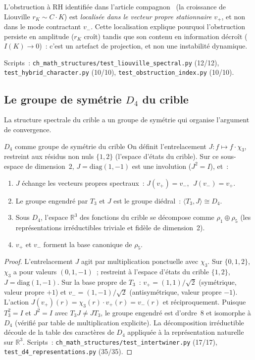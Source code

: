 \documentclass[12pt,a4paper]{article}
\begin{document}
L'obstruction à RH identifiée dans l'article
compagnon~\cite{companion_M1} (la croissance de Liouville
$r_K \sim C \cdot K$) est \emph{localisée dans le vecteur propre
stationnaire $v_+$}, et non dans le mode contractant $v_-$. Cette
localisation explique pourquoi l'obstruction persiste en amplitude
($r_K$ croît) tandis que son contenu en information décroît
($I(K) \to 0$)~: c'est un artefact de projection, et non une
instabilité dynamique.

Scripts~:
\texttt{ch\_math\_structures/test\_liouville\_spectral.py} (12/12),
\texttt{test\_hybrid\_character.py} (10/10),
\texttt{test\_obstruction\_index.py} (10/10).

\subsection{Le groupe de symétrie $D_4$ du crible}
\label{sec:ch7b_d4}

La structure spectrale du crible a un groupe de symétrie qui organise
l'argument de convergence.

\begin{thmbox}{$D_4$ comme groupe de symétrie du crible}
\label{thm:d4_ext}
On définit l'entrelacement $J\colon f \mapsto f \cdot \chi_3$,
restreint aux résidus non nuls $\{1,2\}$ (l'espace d'états du crible).
Sur ce sous-espace de dimension~$2$, $J = \mathrm{diag}(1,-1)$ est une
involution ($J^2 = I$), et~:
\begin{enumerate}[nosep]
\item $J$ échange les vecteurs propres spectraux~:
  $J(v_+) = v_-$, $\;J(v_-) = v_+$.
\item Le groupe engendré par $T_3$ et $J$ est le groupe diédral~:
  $\langle T_3, J \rangle \cong D_4$.
\item Sous $D_4$, l'espace $\mathbb{R}^3$ des fonctions du crible se
  décompose comme $\rho_1 \oplus \rho_5$ (les représentations
  irréductibles triviale et fidèle de dimension~2).
\item $v_+$ et $v_-$ forment la base canonique de $\rho_5$.
\end{enumerate}
\end{thmbox}

\begin{proof}
L'entrelacement $J$ agit par multiplication ponctuelle avec
$\chi_3$. Sur $\{0,1,2\}$, $\chi_3$ a pour valeurs $(0, 1, -1)$~;
restreint à l'espace d'états du crible $\{1,2\}$,
$J = \mathrm{diag}(1,-1)$. Sur la base propre de $T_3$~:
$v_+ = (1, 1)/\sqrt{2}$ (symétrique, valeur propre $+1$) et
$v_- = (1, -1)/\sqrt{2}$ (antisymétrique, valeur propre $-1$).
L'action $J(v_+)(r) = \chi_3(r) \cdot v_+(r) = v_-(r)$ et
réciproquement. Puisque $T_3^2 = I$ et $J^2 = I$ avec
$T_3 J \neq J T_3$, le groupe engendré est d'ordre~$8$ et isomorphe
à $D_4$ (vérifié par table de multiplication explicite). La
décomposition irréductible découle de la table des caractères de
$D_4$ appliquée à la représentation naturelle sur $\mathbb{R}^3$.
Scripts~: \texttt{ch\_math\_structures/test\_intertwiner.py}
(17/17), \texttt{test\_d4\_representations.py} (35/35).
\end{proof}
\end{document}
